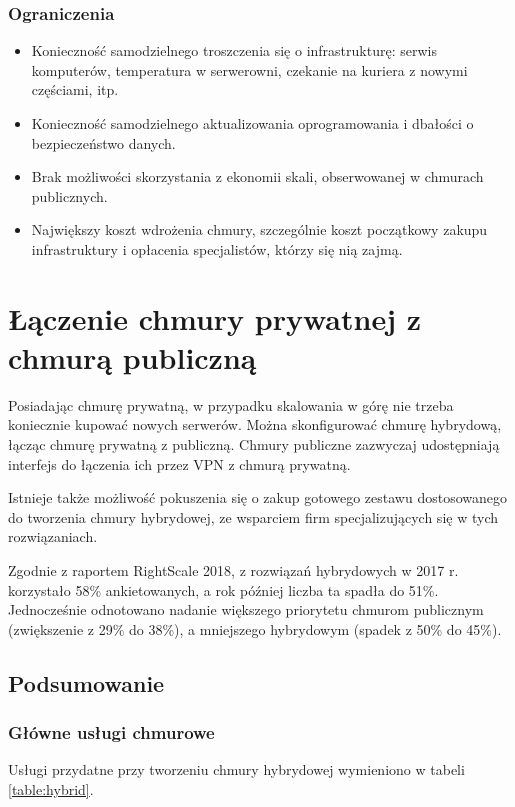 \documentclass[12pt,a4paper,twoside,titlepage,openright]{book}
\begin{document}
\subsubsection{Ograniczenia}
\begin{itemize}
\item Konieczność samodzielnego troszczenia się o infrastrukturę: serwis komputerów, temperatura w serwerowni, czekanie na kuriera z nowymi częściami, itp.
\item Konieczność samodzielnego aktualizowania oprogramowania i dbałości o bezpieczeństwo danych.
\item Brak możliwości skorzystania z ekonomii skali, obserwowanej w chmurach publicznych.
\item Największy koszt wdrożenia chmury, szczególnie koszt początkowy zakupu infrastruktury i opłacenia specjalistów, którzy się nią zajmą.
\end{itemize}

\section{Łączenie chmury prywatnej z chmurą publiczną}

Posiadając chmurę prywatną, w przypadku skalowania w górę nie trzeba koniecznie kupować nowych serwerów. Można skonfigurować chmurę hybrydową, łącząc chmurę prywatną z publiczną. Chmury publiczne zazwyczaj udostępniają interfejs do łączenia ich przez VPN z chmurą prywatną.

Istnieje także możliwość pokuszenia się o zakup gotowego zestawu dostosowanego do tworzenia chmury hybrydowej, ze wsparciem firm specjalizujących się w tych rozwiązaniach.

Zgodnie z raportem RightScale 2018\cite{rightscaleReport}, z rozwiązań hybrydowych w 2017 r. korzystało 58\% ankietowanych, a rok później liczba ta spadła do 51\%. Jednocześnie odnotowano nadanie większego priorytetu chmurom publicznym (zwiększenie z 29\% do 38\%), a mniejszego hybrydowym (spadek z 50\% do 45\%).


\subsection*{Podsumowanie}



\subsubsection*{Główne usługi chmurowe}
Usługi przydatne przy tworzeniu chmury hybrydowej wymieniono w tabeli \ref{table:hybrid}.
\end{document}

